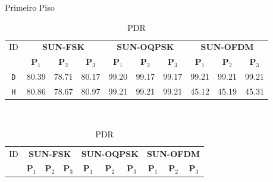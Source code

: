 \begin{table}[H]
      \caption{Primeiro Piso}
      \begin{subtable}{\textwidth}
            \begin{center}
                  \begin{tabular}{|c|c|c|c|c|c|c|c|c|c|}
                        \hline
                        ID         & \multicolumn{3}{c|}{\textbf{SUN-FSK}} & \multicolumn{3}{c|}{\textbf{SUN-OQPSK}} & \multicolumn{3}{c|}{\textbf{SUN-OFDM}}                                                                                                       \\ \cline{2-10}
                                   & \textbf{P$_1$}                        & \textbf{P$_2$}                          & \textbf{P$_3$}                         & \textbf{P$_1$} & \textbf{P$_2$} & \textbf{P$_3$} & \textbf{P$_1$} & \textbf{P$_2$} & \textbf{P$_3$} \\ \hline
                        \texttt{D} & 80.39                                 & 78.71                                   & 80.17                                  & 99.20          & 99.17          & 99.17          & 99.21          & 99.21          & 99.21          \\ \hline
                        \texttt{H} & 80.86                                 & 78.67                                   & 80.97                                  & 99.21          & 99.21          & 99.21          & 45.12          & 45.19          & 45.31          \\ \hline
                  \end{tabular}
                  \caption{PDR}
                  \label{table:pdr1}
            \end{center}
      \end{subtable}%
      \\
      \par\bigskip
      \begin{subtable}{\textwidth}
            \begin{center}
                  \begin{tabular}{|c|c|c|c|c|c|c|c|c|c|}
                        \hline
                        ID         & \multicolumn{3}{c|}{\textbf{SUN-FSK}} & \multicolumn{3}{c|}{\textbf{SUN-OQPSK}} & \multicolumn{3}{c|}{\textbf{SUN-OFDM}}                                                                                                       \\ \cline{2-10}
                                   & \textbf{P$_1$}                        & \textbf{P$_2$}                          & \textbf{P$_3$}                         & \textbf{P$_1$} & \textbf{P$_2$} & \textbf{P$_3$} & \textbf{P$_1$} & \textbf{P$_2$} & \textbf{P$_3$} \\ \hline

\end{tabular}
\end{center}
\end{subtable}
\end{table}
